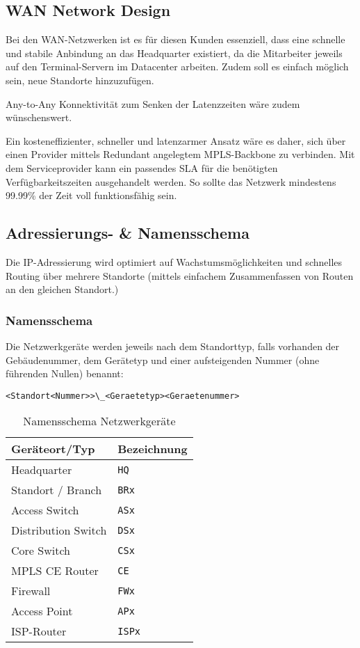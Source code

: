 \subsection{WAN Network Design}

Bei den WAN-Netzwerken ist es für diesen Kunden essenziell, dass eine schnelle und stabile Anbindung an das Headquarter existiert, da die Mitarbeiter jeweils auf den Terminal-Servern im Datacenter arbeiten. Zudem soll es einfach möglich sein, neue Standorte hinzuzufügen.

Any-to-Any Konnektivität zum Senken der Latenzzeiten wäre zudem wünschenswert.

Ein kosteneffizienter, schneller und latenzarmer Ansatz wäre es daher, sich über einen Provider mittels Redundant angelegtem MPLS-Backbone zu verbinden. Mit dem Serviceprovider kann ein passendes SLA für die benötigten Verfügbarkeitszeiten ausgehandelt werden. So sollte das Netzwerk mindestens 99.99\% der Zeit voll funktionsfähig sein.

\subsection{Adressierungs- \& Namensschema}

Die IP-Adressierung wird optimiert auf Wachstumsmöglichkeiten und schnelles Routing über mehrere Standorte (mittels einfachem Zusammenfassen von Routen an den gleichen Standort.)

\subsubsection{Namensschema}

Die Netzwerkgeräte werden jeweils nach dem Standorttyp, falls vorhanden der Gebäudenummer, dem Gerätetyp und einer aufsteigenden Nummer (ohne führenden Nullen) benannt:

\lstinline|<Standort<Nummer>>\_<Geraetetyp><Geraetenummer>|

\begin{table}[h]
	\centering
	\begin{tabu}{l l}
		\toprule 
		Geräteort/Typ & Bezeichnung \\
		\midrule
		Headquarter & \lstinline|HQ|\\
		Standort / Branch & \lstinline|BRx| \\
		\midrule
		Access Switch & \lstinline|ASx|\\
		Distribution Switch & \lstinline|DSx|\\
		Core Switch & \lstinline|CSx|\\
		MPLS CE Router & \lstinline|CE|\\
		Firewall & \lstinline|FWx| \\
		Access Point & \lstinline|APx| \\
		ISP-Router & \lstinline|ISPx| \\
		\bottomrule
	\end{tabu}
	\label{tbl:abteilung_ipv4_adressblock}
	\caption{Namensschema Netzwerkgeräte}
\end{table}

